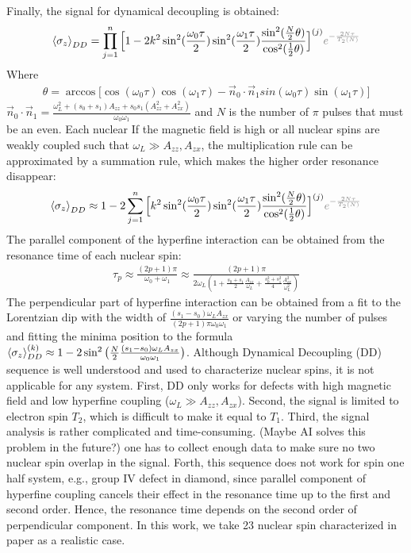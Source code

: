 \documentclass[%
 reprint,
superscriptaddress,
 amsmath,amssymb,
 aps,
]{revtex4-2}
\begin{document}
Finally, the signal for dynamical decoupling is obtained:
\begin{gather}
	\expval{\sigma_z}_{DD} =
	\prod_{j=1}^n \Big[1- 2 k^2  
	\sin^2(\frac{\omega_0 \tau}{2}) \sin^2(\frac{\omega_1 \tau}{2}) \frac{\sin^2(\frac{N}{2} \theta)}{\cos^2(\frac{1}{2}\theta)}  \Big]^{(j)} \textcolor{gray}{ e^{-\frac{2N\tau}{T_2(N)}}} 
\end{gather}
Where
\begin{gather}
	\theta=  \arccos\Big[\cos(\omega_0 \tau) \cos(\omega_1 \tau)- \vec{n}_0 \cdot \vec{n}_1 sin(\omega_0 \tau) \sin(\omega_1 \tau) \Big]
\end{gather}
$\vec{n}_0 \cdot \vec{n}_1 = \frac{\omega_L^2+(s_0+s_1)A_{zz}+s_0 s_1 (A_{zz}^2+A_{zx}^2)}{\omega_0 \omega_1}$ and $N$ is the number of $\pi$ pulses that must be an even. Each nuclear 
If the magnetic field is high or all nuclear spins are weakly coupled such that $\omega_L \gg A_{zz}, A_{zx}$, the multiplication rule can be approximated by a summation rule, which makes the higher order resonance disappear:
\begin{gather}
	\expval{\sigma_z}_{DD} \approx 1 -2
	\sum_{j=1}^n \Big[ k^2 	 \sin^2(\frac{\omega_0 \tau}{2}) \sin^2(\frac{\omega_1 \tau}{2}) \frac{\sin^2(\frac{N}{2} \theta)}{\cos^2(\frac{1}{2}\theta)}  \Big]^{(j)} \textcolor{gray}{ e^{-\frac{2N\tau}{T_2(N)}}} 
\end{gather}
The parallel component of the hyperfine interaction can be obtained from the resonance time of each nuclear spin:
\begin{gather}
	\tau_p \approx  \frac{(2p+1) \pi}{\omega_0 + \omega_1} \approx \frac{(2p+1)\pi}{2\omega_L(1+\frac{s_0+s_1}{2} \frac{A_{zz}}{\omega_L}+ \frac{s_0^2+s_1^2}{4}\frac{A_{zx}^2}{\omega_L^2})}
\end{gather}
The perpendicular part of hyperfine interaction can be obtained from a fit to the Lorentzian dip with the width of $\frac{(s_1-s_0)\omega_L A_{zx}}{(2p+1)\pi\omega_0 \omega_1}$ or varying the number of pulses and fitting the minima position to the formula $\expval{\sigma_z}_{DD}^{(k)} \approx 1- 2 \sin^2\big(\frac{N}{2}\frac{(s_1-s_0)\omega_L A_{zx}}{\omega_0 \omega_1}\big) $. Although Dynamical Decoupling (DD) sequence is well understood and used to characterize nuclear spins, it is not applicable for any system. First, DD only works for defects with high magnetic field and low hyperfine coupling ($\omega_L \gg A_{zz}, A_{zx}$). Second, the signal is limited to electron spin $T_2$, which is difficult to make it equal to $T_1$. Third, the signal analysis is rather complicated and time-consuming. (Maybe AI solves this problem in the future?) one has to collect enough data to make sure no two nuclear spin overlap in the signal. Forth, this sequence does not work for spin one half system, e.g., group IV defect in diamond, since parallel component of hyperfine coupling cancels their effect in the resonance time up to the first and second order. Hence, the resonance time depends on the second order of perpendicular component. In this work, we take 23 nuclear spin characterized in paper \cite{abobeih2019atomic} as a realistic case. 
\end{document}
